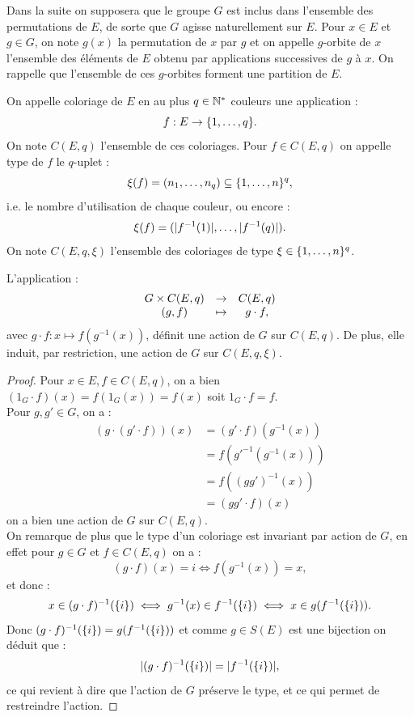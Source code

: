 Dans la suite on supposera que le groupe $G$ est inclus dans l'ensemble des permutations de $E$, 
de sorte que $G$ agisse naturellement sur $E$. 
Pour $x \in E$ et $g \in G$, on note $g(x)$ la permutation de $x$ par $g$ et on appelle $g$-orbite de $x$ l'ensemble des éléments
de $E$ obtenu par applications successives de $g$ à $x$.
On rappelle que l'ensemble de ces $g$-orbites forment une partition de $E$.

\begin{defn}[Coloriage]
On appelle coloriage de $E$ en au plus $q \in \mathbb{N}^\ast$ couleurs une application :
\[ f : E \to \{ 1, \dots, q \} . \]
On note $C(E, q)$ l'ensemble de ces coloriages. Pour $f \in C(E,q)$ on appelle type de $f$ le $q$-uplet :
\[ \xi(f) = (n_1, \dots, n_q) \subseteq \{ 1, \dots, n \}^q, \]
i.e. le nombre d'utilisation de chaque couleur, ou encore :
\[ \xi(f) = ( \lvert f^{-1}(1)\rvert, \dots, \lvert f^{-1}(q)\rvert )  . \]
On note $C(E,q,\xi)$ l'ensemble des coloriages de type $\xi \in \{ 1, \dots, n \}^q$.
\end{defn}

\begin{lem}
\label{lem:1}
L'application :
\[ \begin{array}{c c c}
G \times C(E,q) & \to & C(E,q) \\
(g,f) & \mapsto & g \cdot f ,
\end{array} \]
avec $g \cdot f : x \mapsto f(g^{-1}(x))$, définit une action de $G$ sur $C(E,q)$.
De plus, elle induit, par restriction, une action de $G$ sur $C(E,q,\xi)$.
\end{lem}

\begin{proof}
Pour $x \in E, f \in C(E,q)$, on a bien $(1_G \cdot f)(x) = f(1_G(x)) = f(x)$ soit $1_G \cdot f = f$. \\
Pour $g, g' \in G$, on a :
\begin{align*}
(g \cdot (g' \cdot f))(x) & = (g' \cdot f)(g^{-1}(x)) \\
& = f(g'^{-1} (g^{-1} (x))) \\
& = f((gg')^{-1}(x)) \\
& = (gg' \cdot f)(x)
\end{align*}
on a bien une action de $G$ sur $C(E,q)$. \\
On remarque de plus que le type d'un coloriage est invariant par action de $G$,
en effet pour $g \in G$ et $f \in C(E,q)$ on a :
\[ (g \cdot f)(x) = i \iff f(g^{-1}(x)) = x , \]
et donc : 
\[ x \in (g \cdot f)^{-1}(\{ i \}) \iff g^{-1}(x) \in f^{-1}(\{ i \}) \iff x \in g(f^{-1}(\{ i \}) ). \]
Donc $(g \cdot f)^{-1}(\{ i \}) = g(f^{-1}(\{ i \}) )$ et comme $g \in S(E)$ est une bijection on déduit que :
\[ \lvert(g \cdot f)^{-1}(\{ i \}) \rvert = \lvert f^{-1}(\{ i \}) \rvert , \]
ce qui revient à dire que l'action de $G$ préserve le type, et ce qui permet de restreindre l'action.
\end{proof}

